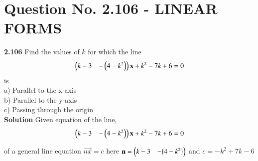 \documentclass[journal,12pt,twocolumn]{IEEEtran}
\begin{document}
\section{\textbf{Question No. 2.106 - LINEAR FORMS}}
\textbf{2.106 }Find the values of $k$ for which the line
\begin{align}
\begin{pmatrix}k-3 & -\begin{pmatrix}4-k^2\end{pmatrix}\end{pmatrix}\mathbf{x}+k^2-7k+6=0
\end{align}
is\\
a) Parallel to the x-axis\\
b) Parallel to the y-axis\\
c) Passing through the origin\\
%
\vskip 0.5cm
\textbf{Solution} Given equation of the line, 
\begin{align}
\begin{pmatrix}k-3 & -\begin{pmatrix}4-k^2\end{pmatrix}\end{pmatrix}\mathbf{x}+k^2-7k+6=0\label{eq:1}
\end{align}
\begin{center}
 \begin{sloppypar}of a general line equation ${\vec{nx} = c}$\newline
here ${\mathbf{n} =\begin{pmatrix}k-3 & -\{4-k^2\}\end{pmatrix}}$\newline
and ${c = -k^2+7k-6}$\end{sloppypar}\end{center}
\end{document}
